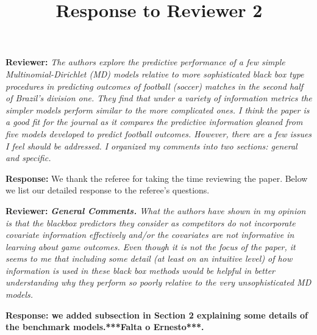 \documentclass[11pt]{article}
\title{Response to Reviewer 2}
\date{}
\renewcommand{\vec}[1]{\mathbf{#1}}
\begin{document}


\maketitle

\hspace{4mm} \textbf{Reviewer:} \textit{
	The authors explore the predictive performance of a few simple Multinomial-Dirichlet (MD)
	models relative to more sophisticated black box type procedures in predicting outcomes of
	football (soccer) matches in the second half of Brazil's division one. They find that under a
	variety of information metrics the simpler models perform similar to the more complicated ones.
	I think the paper is a good fit for the journal as it compares the predictive information gleaned
	from five models developed to predict football outcomes. However, there are a few issues I feel
	should be addressed. I organized my comments into two sections: general and specific.}

\vspace{2mm}
\textbf{Response:} We thank the referee for taking the time reviewing the paper. Below we list our detailed response to the referee's questions.\\

\vspace{6mm}

\hspace{4mm} \textbf{Reviewer:} \textit{\textbf{General Comments.}
	What the authors have shown in my opinion is that the blackbox predictors they consider as
	competitors do not incorporate covariate information effectively and/or the covariates are not
	informative in learning about game outcomes. Even though it is not the focus of the paper,
	it seems to me that including some detail (at least on an intuitive level) of how information is
	used in these black box methods would be helpful in better understanding why they perform so
	poorly relative to the very unsophisticated MD models.}

\vspace{2mm}
\textbf{Response: we added subsection in Section 2 explaining some details of the benchmark models.***Falta o Ernesto***.} 


\end{document}
